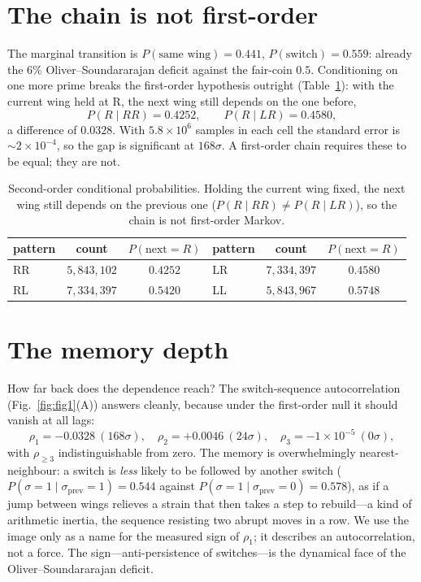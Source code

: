 \documentclass[11pt]{article}
\theoremstyle{definition}
\begin{document}
\section{The chain is not first-order}
The marginal transition is $P(\text{same wing})=0.441$, $P(\text{switch})=0.559$: already the
$6\%$ Oliver--Soundararajan deficit against the fair-coin $0.5$. Conditioning on one more prime breaks
the first-order hypothesis outright (Table~\ref{tab:trip}): with the current wing held at R, the next
wing still depends on the one before,
\[
P(R\mid RR)=0.4252,\qquad P(R\mid LR)=0.4580,
\]
a difference of $0.0328$. With $5.8\times10^{6}$ samples in each cell the standard error is $\sim2\times
10^{-4}$, so the gap is significant at $168\sigma$. A first-order chain requires these to be equal; they
are not.

\begin{table}[t]
\centering\small
\begin{tabular}{lcc|lcc}
\toprule
pattern & count & $P(\text{next}=R)$ & pattern & count & $P(\text{next}=R)$\\
\midrule
RR & $5{,}843{,}102$ & $0.4252$ & LR & $7{,}334{,}397$ & $0.4580$\\
RL & $7{,}334{,}397$ & $0.5420$ & LL & $5{,}843{,}967$ & $0.5748$\\
\bottomrule
\end{tabular}
\caption{Second-order conditional probabilities. Holding the current wing fixed, the next wing still
depends on the previous one ($P(R\mid RR)\ne P(R\mid LR)$), so the chain is not first-order Markov.}
\label{tab:trip}
\end{table}

\section{The memory depth}
How far back does the dependence reach? The switch-sequence autocorrelation (Fig.~\ref{fig:fig1}(A))
answers cleanly, because under the first-order null it should vanish at all lags:
\[
\rho_1=-0.0328\ (168\sigma),\quad \rho_2=+0.0046\ (24\sigma),\quad \rho_3=-1\times10^{-5}\ (0\sigma),
\]
with $\rho_{\ge3}$ indistinguishable from zero. The memory is overwhelmingly nearest-neighbour: a switch
is \emph{less} likely to be followed by another switch ($P(\sigma{=}1\mid\sigma_{\text{prev}}{=}1)=0.544$
against $P(\sigma{=}1\mid\sigma_{\text{prev}}{=}0)=0.578$), as if a jump between wings relieves a strain
that then takes a step to rebuild---a kind of arithmetic inertia, the sequence resisting two abrupt
moves in a row. We use the image only as a name for the measured sign of $\rho_1$; it describes an
autocorrelation, not a force. The sign---anti-persistence of switches---is the dynamical face of
the Oliver--Soundararajan deficit.
\end{document}
